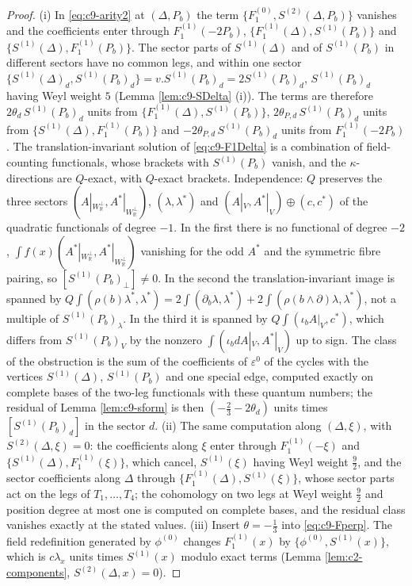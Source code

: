 \begin{proof}
(i) In \eqref{eq:c9-arity2} at $(\Delta,P_b)$ the term $\{F_1^{(0)},S^{(2)}(\Delta,P_b)\}$ vanishes and the coefficients enter through $F_1^{(1)}(-2P_b)$, $\{F_1^{(1)}(\Delta),S^{(1)}(P_b)\}$ and $\{S^{(1)}(\Delta),F_1^{(1)}(P_b)\}$. The sector parts of $S^{(1)}(\Delta)$ and of $S^{(1)}(P_b)$ in different sectors have no common legs, and within one sector $\{S^{(1)}(\Delta)_d,S^{(1)}(P_b)_d\}=v.S^{(1)}(P_b)_d=2S^{(1)}(P_b)_d$, $S^{(1)}(P_b)_d$ having Weyl weight $5$ (Lemma \ref{lem:c9-SDelta} (i)). The terms are therefore $2\theta_d\,S^{(1)}(P_b)_d$ units from $\{F_1^{(1)}(\Delta),S^{(1)}(P_b)\}$, $2\theta_{P,d}\,S^{(1)}(P_b)_d$ units from $\{S^{(1)}(\Delta),F_1^{(1)}(P_b)\}$ and $-2\theta_{P,d}\,S^{(1)}(P_b)_d$ units from $F_1^{(1)}(-2P_b)$. The translation-invariant solution of \eqref{eq:c9-F1Delta} is a combination of field-counting functionals, whose brackets with $S^{(1)}(P_b)$ vanish, and the $\kappa$-directions are $Q$-exact, with $Q$-exact brackets. Independence: $Q$ preserves the three sectors $(A|_{W_{\mathbb R}^\perp},A^*|_{W_{\mathbb R}^\perp})$, $(\lambda,\lambda^*)$ and $(A|_V,A^*|_V)\oplus(c,c^*)$ of the quadratic functionals of degree $-1$. In the first there is no functional of degree $-2$, $\int f(x)(A^*|_{W_{\mathbb R}^\perp},A^*|_{W_{\mathbb R}^\perp})$ vanishing for the odd $A^*$ and the symmetric fibre pairing, so $[S^{(1)}(P_b)_\perp]\neq0$. In the second the translation-invariant image is spanned by $Q\int(\rho(b)\lambda^*,\lambda^*)=2\int(\partial_b\lambda,\lambda^*)+2\int(\rho(b\wedge\partial)\lambda,\lambda^*)$, not a multiple of $S^{(1)}(P_b)_\lambda$. In the third it is spanned by $Q\int(\iota_bA|_V,c^*)$, which differs from $S^{(1)}(P_b)_V$ by the nonzero $\int(\iota_bdA|_V,A^*|_V)$ up to sign. The class of the obstruction is the sum of the coefficients of $\varepsilon^0$ of the cycles with the vertices $S^{(1)}(\Delta)$, $S^{(1)}(P_b)$ and one special edge, computed exactly on complete bases of the two-leg functionals with these quantum numbers; the residual of Lemma \ref{lem:c9-sform} is then $(-\tfrac23-2\theta_d)$ units times $[S^{(1)}(P_b)_d]$ in the sector $d$. (ii) The same computation along $(\Delta,\xi)$, with $S^{(2)}(\Delta,\xi)=0$: the coefficients along $\xi$ enter through $F_1^{(1)}(-\xi)$ and $\{S^{(1)}(\Delta),F_1^{(1)}(\xi)\}$, which cancel, $S^{(1)}(\xi)$ having Weyl weight $\tfrac92$, and the sector coefficients along $\Delta$ through $\{F_1^{(1)}(\Delta),S^{(1)}(\xi)\}$, whose sector parts act on the legs of $T_1,\dots,T_4$; the cohomology on two legs at Weyl weight $\tfrac92$ and position degree at most one is computed on complete bases, and the residual class vanishes exactly at the stated values. (iii) Insert $\theta=-\tfrac13$ into \eqref{eq:c9-Fperp}. The field redefinition generated by $\phi^{(0)}$ changes $F_1^{(1)}(x)$ by $\{\phi^{(0)},S^{(1)}(x)\}$, which is $c\lambda_x$ units times $S^{(1)}(x)$ modulo exact terms (Lemma \ref{lem:c2-components}, $S^{(2)}(\Delta,x)=0$).
\end{proof}

